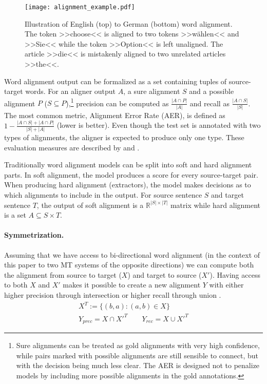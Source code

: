 \begin{figure*}[ht!]
    \vspace{0.01cm}
    \center
    \texttt{[image: alignment\_example.pdf]}
    \caption{
        Illustration of English (top) to German (bottom) word alignment. The token >>choose<< is aligned to two tokens >>wählen<< and >>Sie<< while the token >>Option<< is left unaligned. The article >>die<< is mistakenly aligned to two unrelated articles >>the<<.
        \label{fig:alignment_example}
    }
    \vspace{0.2cm}
\end{figure*}

Word alignment output can be formalized as a set containing tuples of source-target words. For an aligner output $A$, a sure alignment $S$ and a possible alignment $P$ ($S\subseteq P$),\footnote{Sure alignments can be treated as gold alignments with very high confidence, while pairs marked with possible alignments are still sensible to connect, but with the decision being much less clear. The AER is designed not to penalize models by including more possible alignments in the gold annotations.} precision can be computed as $ \frac{|A \cap P|}{|A|}$ and recall as $\frac{|A \cap S|}{|S|}$. The most common metric, Alignment Error Rate (AER), is defined as $1-\frac{|A\cap S| + |A \cap P|}{|S|+|A|}$ (lower is better). Even though the test set is annotated with two types of alignments, the aligner is expected to produce only one type. These evaluation measures are described by \citet{mihalcea2003evaluation} and \citet{och2003systematic}.

Traditionally word alignment models can be split into soft and hard alignment parts. In soft alignment, the model produces a score for every source-target pair. When producing hard alignment (extractors), the model makes decisions as to which alignments to include in the output. For source sentence $S$ and target sentence $T$, the output of soft alignment is a $\mathbb{R}^{|S|\times|T|}$ matrix while hard alignment is a set $A \subseteq S\times T$.


\paragraph{Symmetrization.}

Assuming that we have access to bi-directional word alignment (in the context of this paper to two MT systems of the opposite directions) we can compute both the alignment from source to target ($X$) and target to source ($X'$).
Having access to both $X$ and $X'$ makes it possible to create a new alignment $Y$ with either higher precision through intersection or higher recall through union \citep{koehn2009statistical}.
\begin{gather*}
    X^T := \{(b, a): (a, b) \in X\} \\
    Y_{prec} = X \cap X'^T \qquad Y_{rec} = X \cup X'^T
\end{gather*}

